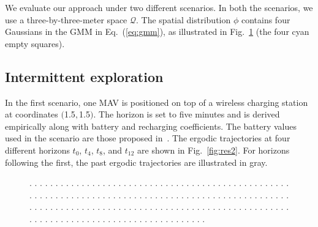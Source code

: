 \documentclass[lettersize,journal,twoside]{IEEEtran}
\theoremstyle{definition}
\begin{document}
We evaluate our approach under two different scenarios. In both the scenarios, we use a three-by-three-meter space $\mathcal{Q}$. The spatial distribution $\phi$ contains four Gaussians in the GMM in Eq.~(\ref{eq:gmm}), as illustrated in Fig.~\ref{fig:scenario} (the four cyan empty squares).

\subsection*{Intermittent exploration}
\noindent
In the first scenario, one MAV is positioned on top of a wireless charging station at coordinates $($1.5$,$1.5$)$. The horizon is set to five minutes and is derived empirically along with battery and recharging coefficients. The battery values used in the scenario are those proposed in~\cite{zhao2017observability}. The ergodic trajectories at four different horizons $t_0$, $t_4$, $t_8$, and $t_{12}$ are shown in Fig.~\ref{fig:res2}. For horizons following the first, the past ergodic trajectories are illustrated in gray.

\begin{figure}[t!]
  \begin{minipage}[t!]{.48\columnwidth}
    
  \end{minipage}
  \begin{minipage}[c]{.5\columnwidth}
    \caption{.   .   .   .   .   .   .   .   .   .   .   .   .   .   .   .   .   .   .   .   .   .   .   .   .   .   .   .   .   .   .   .   .   .   .   .   .   .   .   .   .   .   .   .   .   .   .   .   .   .   .   .   .   .   .   .   .   .   .   .   .   .   .   .   .   .   .   .   .   .   .   .   .   .   .   .   .   .   .   .   .   .   .   .   .   .   .   .   .   .   .   .   .   .   .   .   .   .   .   .   .   .   .   .   .   .   .   .   .   .   .   .   .   .   .   .   .   .   .   .   .   .   .   .   .   .   .   .   .   .   .   .   .   .   .   .   .   .   .   .   .   .   .   .   .   .   .   .   .   .   .   .   .   .   .   .   .   .   .   .   .   .   .   .   .   .   .   .   .   .   .   .   .   .   .   .   .   .   .   .   .   .   .   .}
    \label{fig:scenario}
  \end{minipage}
\end{figure}
\end{document}

